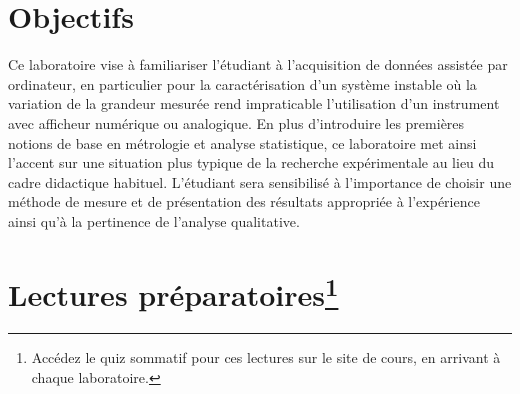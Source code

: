 \documentclass[canadien,12pt,oneside,letterpaper]{article}
\begin{document}
\section{Objectifs} \label{sec:obj}

Ce laboratoire vise à familiariser l’étudiant à l’acquisition de données assistée par ordinateur, en particulier pour la caractérisation d’un système instable où la variation de la grandeur mesurée rend impraticable l’utilisation d’un instrument avec afficheur numérique ou analogique. En plus d’introduire les premières notions de base en métrologie et analyse statistique, ce laboratoire met ainsi l’accent sur une situation plus typique de la recherche expérimentale au lieu du cadre didactique habituel. L’étudiant sera sensibilisé à l’importance de choisir une méthode de mesure et de présentation des résultats appropriée à l’expérience ainsi qu’à la pertinence de l’analyse qualitative. 


\section[Lectures préparatoires]{Lectures préparatoires\footnote{Accédez le quiz sommatif pour ces lectures sur le site de cours, en arrivant à chaque laboratoire.}} \label{sec:prep}
\vspace{-2ex}
\end{document}
